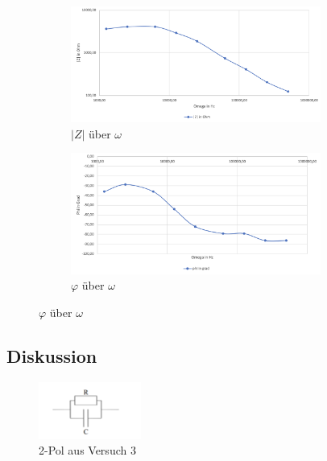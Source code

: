         \begin{figure}[H]
            \begin{subfigure}{0.5\textwidth}
                \centering
                \includegraphics[width=0.9\textwidth]{bilder/Versuch3_1.png}
                \caption{$|Z|$ über $\omega$}
                \label{fig:Versuch3_Messwerte_1}
            \end{subfigure}
            \begin{subfigure}{0.5\textwidth}
                \centering
                \includegraphics[width=0.9\textwidth]{bilder/Versuch3_2.png}
                \caption{$\varphi$ über $\omega$}
                \label{fig:Versuch3_Messwerte_2}
            \end{subfigure}
        \end{figure}

    \subsection{Diskussion}

        \begin{figure}[H]
            \centering
                \includegraphics[width=0.3\textwidth]{bilder/2pol.png}
                \caption{2-Pol aus Versuch 3}
                \label{fig:2pol}
        \end{figure}


